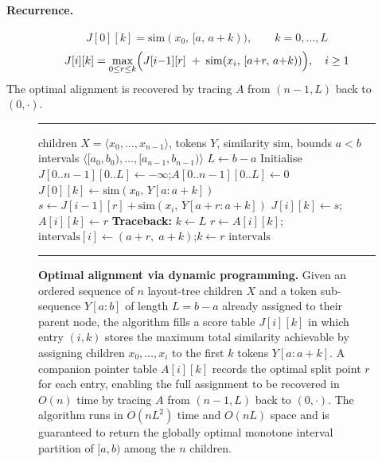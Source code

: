 \documentclass{article}
\theoremstyle{definition}
\begin{document}
\paragraph{Recurrence.}
\[
  J[0][k] = \mathrm{sim}(x_0,\,[a,\,a{+}k)),
  \qquad k = 0, \ldots, L
\]
\[
  J[i][k] = \max_{0 \le r \le k}
  \Bigl( J[i{-}1][r] \;+\; \mathrm{sim}(x_i,\,[a{+}r,\,a{+}k)) \Bigr),
  \quad i \ge 1
\]
The optimal alignment is recovered by tracing $A$ from $(n{-}1, L)$ back to
$(0, \cdot)$.

\begin{figure}[h]
  \centering
  \hrule\vspace{4pt}
  \begin{minipage}{0.92\linewidth}
    \begin{algorithmic}[1]
      \Require children $X{=}\langle x_0,\ldots,x_{n-1}\rangle$,
      tokens $Y$, similarity $\mathrm{sim}$, bounds $a < b$
      \Ensure  intervals $\langle[a_0,b_0),\ldots,[a_{n-1},b_{n-1})\rangle$
      \State $L \gets b - a$
      \State Initialise $J[0..n{-}1][0..L] \gets -\infty$;\quad $A[0..n{-}1][0..L] \gets 0$
      \State $J[0][k] \gets \mathrm{sim}(x_0,\, Y[a:a{+}k])$
      \EndFor
      \State $s \gets J[i{-}1][r] + \mathrm{sim}(x_i,\, Y[a{+}r:a{+}k])$
      \State $J[i][k] \gets s$;\quad $A[i][k] \gets r$
      \EndIf
      \EndFor
      \EndFor
      \EndFor
      \State \textbf{Traceback:}\; $k \gets L$
      \State $r \gets A[i][k]$;\quad $\mathrm{intervals}[i] \gets (a{+}r,\; a{+}k)$;\quad $k \gets r$
      \EndFor
      \State \Return $\mathrm{intervals}$
    \end{algorithmic}
  \end{minipage}
  \vspace{4pt}\hrule
  \caption{%
  \textbf{Optimal alignment via dynamic programming.}
  Given an ordered sequence of $n$ layout-tree children $X$ and a token
  sub-sequence $Y[a:b]$ of length $L = b - a$ already assigned to their
  parent node, the algorithm fills a score table $J[i][k]$ in which entry
  $(i, k)$ stores the maximum total similarity achievable by assigning
  children $x_0, \ldots, x_i$ to the first $k$ tokens $Y[a:a{+}k]$.
  A companion pointer table $A[i][k]$ records the optimal split point $r$
  for each entry, enabling the full assignment to be recovered in $O(n)$
  time by tracing $A$ from $(n{-}1, L)$ back to $(0, \cdot)$.
  The algorithm runs in $O(nL^2)$ time and $O(nL)$ space and is guaranteed
  to return the globally optimal monotone interval partition of $[a, b)$
  among the $n$ children.%
  }
  \label{alg:dp}
\end{figure}
\end{document}
